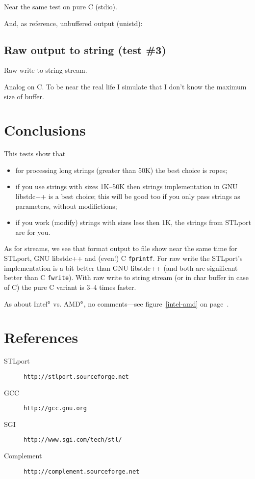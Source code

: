 \documentclass[a4paper]{article}
\providecommand{\STLport}{{\fontfamily{cmss}\selectfont STLport}}
\providecommand{\libstd}{{\fontfamily{cmtt}\selectfont GNU \mbox{libstdc++}}}
\begin{document}
Near the same test on pure C (stdio).



And, as reference, unbuffered output (unistd):



\subsection{Raw output to string\label{sstream-raw} (test \#3)}

Raw write to string stream.



Analog on C. To be near the real life I simulate that I don't know
the maximum size of buffer.



\section{Conclusions}

This tests show that
\begin{itemize}
  \item for processing long strings (greater than 50K) the best choice is
        ropes;
  \item if you use strings with sizes 1K--50K then strings implementation in 
        \libstd{} is a best choice; this will be good too if you only pass
        strings as parameters, without modifictions;
  \item if you work (modify) strings with sizes less then 1K,
        the strings from \STLport{} are for you.
\end{itemize}

As for streams, we see that format output to file show near the same time
for \STLport{}, \libstd{} and (even!) C \verb|fprintf|. For raw write
the \STLport's implementation is a bit better than \libstd{} (and both are
significant better than C \verb|fwrite|). With raw write to string stream
(or in char buffer in case of C) the pure C variant is 3--4 times faster.

As about Intel$^{\mbox{\tiny\textregistered}}$ vs. AMD$^{\mbox{\tiny\textregistered}}$, no comments---see figure~\ref{intel-amd} on page~\pageref{intel-amd}.

\section{References}

\noindent
\begin{description}
  \item[STLport] \texttt{http://stlport.sourceforge.net}
  \item[GCC]     \texttt{http://gcc.gnu.org}
  \item[SGI]     \texttt{http://www.sgi.com/tech/stl/}
  \item[Complement] \texttt{http://complement.sourceforge.net}
\end{description}
\end{document}

